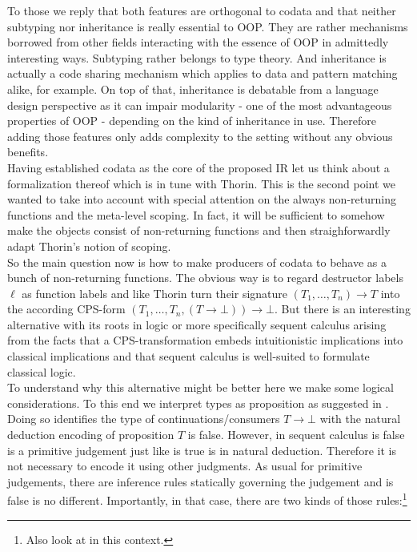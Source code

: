 To those we reply that both features are orthogonal to codata and that neither subtyping nor inheritance is really essential to OOP.
They are rather mechanisms borrowed from other fields interacting with the essence of OOP in admittedly interesting ways.
Subtyping rather belongs to type theory.
And inheritance is actually a code sharing mechanism which applies to data and pattern matching alike, for example.
On top of that, inheritance is debatable from a language design perspective as it can impair modularity - one of the most advantageous properties of OOP - depending on the kind of inheritance in use.
Therefore adding those features only adds complexity to the setting without any obvious benefits.
\\
Having established codata as the core of the proposed IR let us think about a formalization thereof which is in tune with Thorin.
This is the second point we wanted to take into account with special attention on the always non-returning functions and the meta-level scoping.
In fact, it will be sufficient to somehow make the objects consist of non-returning functions and then straighforwardly adapt Thorin's notion of scoping.
\\
So the main question now is how to make producers of codata to behave as a bunch of non-returning functions.
The obvious way is to regard destructor labels $\ell$ as function labels and like Thorin turn their signature $(T_{1}, \ldots, T_{n}) \to T$ into the according CPS-form $(T_{1}, \ldots, T_{n}, (T \to \bot)) \to \bot$.
But there is an interesting alternative with its roots in logic or more specifically sequent calculus arising from the facts that a CPS-transformation embeds intuitionistic implications into classical implications and that sequent calculus is well-suited to formulate classical logic.
\\
To understand why this alternative might be better here we make some logical considerations.
To this end we interpret types as proposition as suggested in \cite{wadler}.
Doing so identifies the type of continuations/consumers $T \to \bot$ with the natural deduction encoding of {\glqq}proposition $T$ is false{\grqq}.
However, in sequent calculus {\glqq}is false{\grqq} is a primitive judgement just like {\glqq}is true{\grqq} is in natural deduction.
Therefore it is not necessary to encode it using other judgments.
As usual for primitive judgements, there are inference rules statically governing the judgement and {\glqq}is false{\grqq} is no different.
Importantly, in that case, there are two kinds of those rules:\footnote{Also look at \cite{zeilberger} in this context.}
